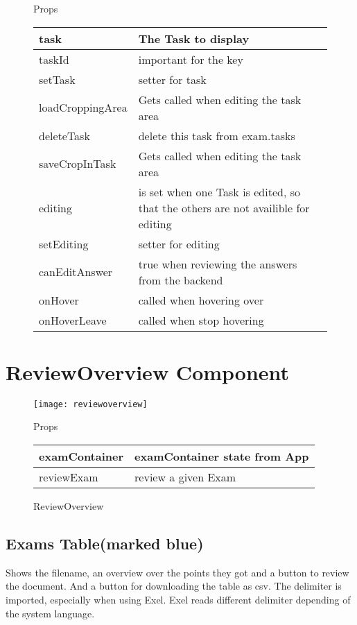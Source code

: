 \begin{figure}[H]
Props

    \begin{tabularx}{\textwidth}{|l|X|} 
    \hline
    task & The Task to display \\
    \hline
    taskId & important for the key \\
    \hline
    setTask & setter for task \\
    \hline
    loadCroppingArea & Gets called when editing the task area \\
    \hline
    deleteTask & delete this task from exam.tasks \\
    \hline
    saveCropInTask & Gets called when editing the task area \\
    \hline
    editing & is set when one Task is edited, so that the others are not
    availible for editing\\
    \hline
    setEditing & setter for editing \\
    \hline
    canEditAnswer & true when reviewing the answers from the backend \\
    \hline
    onHover & called when hovering over \\
    \hline
    onHoverLeave & called when stop hovering \\
    \hline
    \end{tabularx}
\end{figure}

\section{ReviewOverview Component}
\begin{figure}[H]
    \texttt{[image: reviewoverview]}
    \caption{ReviewOverview}

Props\\
    \begin{tabularx}{\textwidth}{|l|X|} 
    \hline
    examContainer & examContainer state from App \\
    \hline
    reviewExam & review a given Exam \\
    \hline
    \end{tabularx}
\end{figure}

\subsection{Exams Table(marked blue)}
Shows the filename, an overview over the points they got and a button to review the document.
And a button for downloading the table as csv.
The delimiter is imported, especially when using Exel.
Exel reads different delimiter depending of the system language.

